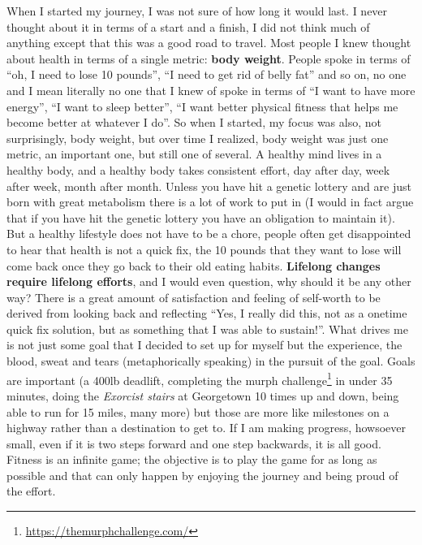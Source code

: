 \documentclass[
  oneside]{book}
\DeclareRobustCommand{\href}[2]{#2\footnote{\url{#1}}}
\begin{document}
When I started my journey, I was not sure of how long it would last. I never thought about it in terms of a start and a finish, I did not think much of anything except that this was a good road to travel. Most people I knew thought about health in terms of a single metric: \textbf{body weight}. People spoke in terms of ``oh, I need to lose 10 pounds'', ``I need to get rid of belly fat'' and so on, no one and I mean literally no one that I knew of spoke in terms of ``I want to have more energy'', ``I want to sleep better'', ``I want better physical fitness that helps me become better at whatever I do''. So when I started, my focus was also, not surprisingly, body weight, but over time I realized, body weight was just one metric, an important one, but still one of several. A healthy mind lives in a healthy body, and a healthy body takes consistent effort, day after day, week after week, month after month. Unless you have hit a genetic lottery and are just born with great metabolism there is a lot of work to put in (I would in fact argue that if you have hit the genetic lottery you have an obligation to maintain it). But a healthy lifestyle does not have to be a chore, people often get disappointed to hear that health is not a quick fix, the 10 pounds that they want to lose will come back once they go back to their old eating habits. \textbf{Lifelong changes require lifelong efforts}, and I would even question, why should it be any other way? There is a great amount of satisfaction and feeling of self-worth to be derived from looking back and reflecting ``Yes, I really did this, not as a onetime quick fix solution, but as something that I was able to sustain!''. What drives me is not just some goal that I decided to set up for myself but the experience, the blood, sweat and tears (metaphorically speaking) in the pursuit of the goal. Goals are important (a 400lb deadlift, completing the \href{https://themurphchallenge.com/}{murph challenge} in under 35 minutes, doing the \emph{Exorcist stairs} at Georgetown 10 times up and down, being able to run for 15 miles, many more) but those are more like milestones on a highway rather than a destination to get to. If I am making progress, howsoever small, even if it is two steps forward and one step backwards, it is all good. Fitness is an infinite game; the objective is to play the game for as long as possible and that can only happen by enjoying the journey and being proud of the effort.
\end{document}
